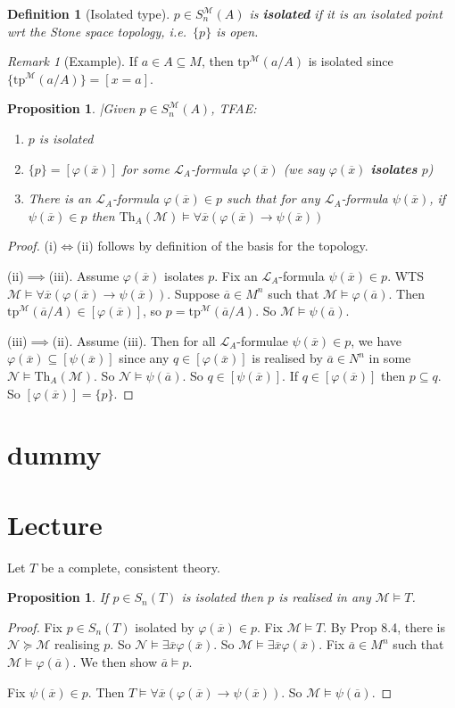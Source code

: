\documentclass[]{article}
\theoremstyle{custhm}
\theoremstyle{cusdef}
\newtheorem{defin}[theorem]{Definition}
\theoremstyle{custhm}
\theoremstyle{custhm}
\theoremstyle{custhm}
\newtheorem{prop}[theorem]{Proposition}
\theoremstyle{ex}
\theoremstyle{custhm}
\theoremstyle{cusdef}
\theoremstyle{remark}
\newtheorem*{remark*}{Remark}
\theoremstyle{remark}
\newcommand{\ra}{\rightarrow}
\newcommand{\ie}{\textit{i.e.}}
\newcommand{\undf}[1]{\textit{\textbf{#1}}}
\renewcommand{\L}{\mathcal{L}}
\newcommand{\M}{\mathcal{M}}
\renewcommand{\phi}{\varphi}
\renewcommand{\bar}{\overline}
\newcommand{\Th}{\textrm{Th}}
\newcommand{\tp}{\textrm{tp}}
\newcommand{\N}{\mathcal{N}}
\newcommand{\sman}{S_n^\M(A)}
\renewcommand{\subset}{\subseteq}
\begin{document}
\begin{defin}[Isolated type]
$p\in \sman$ is \undf{isolated} if it is an isolated point wrt the Stone space topology, \ie\ $\{p\}$ is open.
\end{defin}
\begin{remark*}[Example]
If $a\in A\subset M$, then $\tp^\M(a/A)$ is isolated since $\{\tp^\M(a/A)\} = [x = a]$.
\end{remark*}
\begin{prop}
|Given $p\in \sman$, TFAE:
\begin{enumerate}[label=\roman*)]
	\item $p$ is isolated
	\item $\{p\} = [\phi(\bar{x})]$ for some $\L_A$-formula $\phi(\bar{x})$ (we say $\phi(\bar{x})$ \undf{isolates} $p$)
	\item There is an $\L_A$-formula $\phi(\bar{x})\in p$ such that for any $\L_A$-formula $\psi(\bar{x})$, if $\psi(\bar{x})\in p$ then $\Th_A(\M)\models \forall \bar{x}(\phi(\bar{x})\ra\psi(\bar{x}))$
\end{enumerate}
\end{prop}
\begin{proof}
(i)$\iff$(ii) follows by definition of the basis for the topology.

(ii)$\implies$(iii). Assume $\phi(\bar{x})$ isolates $p$. Fix an $\L_A$-formula $\psi(\bar{x})\in p$. WTS $\M\models \forall \bar{x}(\phi(\bar{x})\ra\psi(\bar{x}))$. Suppose $\bar{a}\in M^n$ such that $\M\models \phi(\bar{a})$. Then $\tp^\M(\bar{a}/A)\in [\phi(\bar{x})]$, so $p = \tp^\M(\bar{a}/A)$. So $\M\models \psi(\bar{a})$.

(iii)$\implies$(ii). Assume (iii). Then for all $\L_A$-formulae $\psi(\bar{x})\in p$, we have $\phi(\bar{x})\subset[\psi(\bar{x})]$ since any $q \in [\phi(\bar{x})]$ is realised by $\bar{a} \in N^n$ in some $\N\models \Th_A(\M)$. So $\N\models \psi(\bar{a})$. So $q \in [\psi(\bar{x})]$. If $q \in [\phi(\bar{x})]$ then $p\subset q$. So $[\phi(\bar{x})] = \{p\}$.
\end{proof} 
\section{dummy}
\section{Lecture}

Let $T$ be a complete, consistent theory.

\begin{prop}
If $p \in S_n(T)$ is isolated then $p$ is realised in any $\M\models T$.
\end{prop}
\begin{proof}
Fix $p \in S_n(T)$ isolated by $\phi(\bar{x})\in p$. Fix $\M\models T$. By Prop 8.4, there is $\N\succeq \M$ realising $p$. So $\N\models \exists \bar{x}\phi(\bar{x})$. So $\M\models \exists \bar{x}\phi(\bar{x})$. Fix $\bar{a}\in M^n$ such that $\M\models \phi(\bar{a})$. We then show $\bar{a}\models p$.

Fix $\psi(\bar{x})\in p$. Then $T\models \forall \bar{x}(\phi(\bar{x})\ra\psi(\bar{x}))$. So $\M\models \psi(\bar{a})$.
\end{proof}
\end{document}
